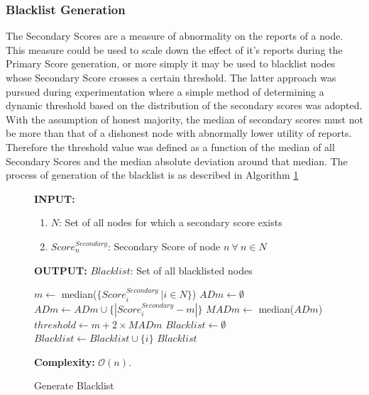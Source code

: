 \documentclass[journal]{IEEEtran}
\makeatletter
\newcommand{\removelatexerror}{\let\@latex@error\@gobble}
\makeatother
\begin{document}
\subsubsection{Blacklist Generation}
The Secondary Scores are a measure of abnormality on the reports of a node. This measure could be used to scale down the effect of it's reports during the Primary Score generation, or more simply it may be used to blacklist nodes whose Secondary Score crosses a certain threshold. The latter approach was pursued during experimentation where a simple method of determining a dynamic threshold based on the distribution of the secondary scores was adopted. With the assumption of honest majority, the median of secondary scores must not be more than that of a dishonest node with abnormally lower utility of reports. Therefore the threshold value was defined as a function of the median of all Secondary Scores and the median absolute deviation around that median. The process of generation of the blacklist is as described in %
Algorithm \ref {algo:BLKLGen} 
\begin{figure}[!t]\removelatexerror
	\label{fig:ALG_blklist}
\begin{algorithm}[H]
	\caption{Generate Blacklist}
	\label{algo:BLKLGen}
	\textbf{INPUT:}
		\begin{enumerate}
			\item $ N $: Set of all nodes for which a secondary score exists
			\item $Score^{Secondary}_n$: Secondary Score of node $n\ \forall\ n \in N$
		\end{enumerate}
	\textbf{OUTPUT:} $Blacklist$: Set of all blacklisted nodes
	\begin{algorithmic}[1]
		\STATE $ m \leftarrow  $ median($\{ Score^{Secondary}_i\ | i \in N\}$)
		\STATE $ ADm \leftarrow \emptyset $
		\STATE $ ADm \leftarrow ADm \cup \{ | Score^{Secondary}_i - m | \} $
		\ENDFOR
		\STATE $ MADm \leftarrow $ median($ADm$)
		\STATE $ threshold \leftarrow m+ 2\times MADm $ 
		\STATE $ Blacklist \leftarrow \emptyset $
				\STATE $ Blacklist \leftarrow Blacklist \cup \{ i \} $
			\ENDIF
		\ENDFOR
		\RETURN $ Blacklist $ 
	\end{algorithmic}
	\textbf{Complexity:} $\mathcal{O}(n)$.
\end{algorithm}
\end{figure}
\end{document}
